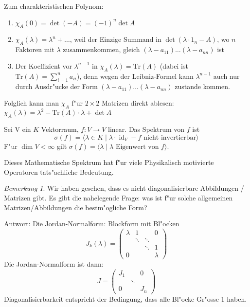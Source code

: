 \documentclass[oneside,fontsize=11pt,paper=a4,BCOR=0mm,DIV=12,automark,headsepline]{scrbook}
\newcommand{\gq}[1]{\glqq{}#1\grqq{}} %
\DeclareMathOperator{\mId}{id}
\theoremstyle{remark}
\theoremstyle{definition}
\theoremstyle{definition}
\theoremstyle{remark}
\newtheorem*{bem}{Bemerkung}
\begin{document}
Zum charakteristischen Polynom:
\begin{relation}
  \begin{enumerate}
  \item $\chi_A(0) = \det (-A) = (-1)^n \det A$
  \item $\chi_A (\lambda) = \lambda^n + \dots$, weil der Einzige Summand in \(\det (\lambda\cdot 1_n-A)\), wo \(n\) Faktoren mit \(\lambda\) zusammenkommen, gleich \((\lambda- a_{11})\dots (\lambda - a_{nn})\) ist
  \item Der Koeffizient vor \(\lambda^{n-1}\) in \(\chi_A(\lambda)=\text{Tr}(A)\) (dabei ist \(\text{Tr}(A) = \sum_{i=1}^n a_{ii}\)), denn wegen der Leibniz-Formel kann \(\lambda^{n-1}\) auch nur durch Ausdr"ucke der Form \((\lambda - a_{11})\dots (\lambda - a_{nn})\) zustande kommen.
  \end{enumerate}
\end{relation}

Folglich kann man $\chi_A$ f"ur $2\times 2$ Matrizen direkt ablesen: \(\chi_A(\lambda) = \lambda^2 - \text{Tr}(A)\cdot \lambda + \det A\)

\begin{definition}{}{}
  Sei V ein $K$ Vektorraum, \(f: V\to V\) linear. Das Spektrum von \(f\) ist \[\sigma(f) = \langle \lambda\in K \mid \lambda\cdot\mId_V -f \text{ nicht invertierbar}\rangle\]
  F"ur \(\dim V < \infty\) gilt \(\sigma(f) = \langle \lambda \mid \lambda \text{ Eigenwert von }f\rangle\).
\end{definition}
Dieses Mathematische Spektrum hat f"ur viele Physikalisch motivierte Operatoren
tats"achliche Bedeutung.

\begin{bem}
  Wir haben gesehen, dass es nicht-diagonalisierbare Abbildungen / Matrizen gibt. Es gibt die
  nahelegende Frage: was ist f"ur solche allgemeinen Matrizen/Abbildungen die
  \gq{bestm"ogliche} Form?
\end{bem}
\begin{relation}
  Antwort: Die Jordan-Normalform: Blockform mit Bl"ocken \[J_k(\lambda) =
    \begin{pmatrix}
      \lambda & 1 &  & 0 \\
      & \ddots & \ddots &  \\
      &  & \ddots & 1 \\
      0 &  &  & \lambda
    \end{pmatrix}
  \]
  Die Jordan-Normalform ist dann:
  \[ J= 
    \begin{pmatrix}
      J_1 & & 0 \\
      & \ddots & \\
      0 & & J_n
    \end{pmatrix}
  \]
  Diagonalisierbarkeit entspricht der Bedingung, dass  alle Bl"ocke Gr"osse 1 haben.
\end{relation}
\end{document}
